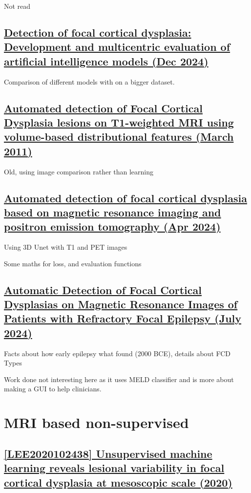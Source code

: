Not read

\newpage
\subsection{\href{https://pmc.ncbi.nlm.nih.gov/articles/PMC11997906/}{Detection of focal cortical dysplasia: Development and multicentric evaluation of artificial intelligence models (Dec 2024)}}

Comparison of different models with on a bigger dataset.

\newpage
\subsection{\href{https://ieeexplore.ieee.org/document/5872541}{Automated detection of Focal Cortical Dysplasia lesions on T1-weighted MRI using volume-based distributional features (March 2011)}}

Old, using image comparison rather than learning

\newpage
\subsection{\href{https://www.sciencedirect.com/science/article/pii/S1059131124000463}{Automated detection of focal cortical dysplasia based on magnetic resonance imaging and positron emission tomography (Apr 2024)}}

Using 3D Unet with T1 and PET images

Some maths for loss, and evaluation functions

\newpage
\subsection{\href{file://papers/Automatic_detection_joao.pdf}{Automatic Detection of Focal Cortical Dysplasias on Magnetic Resonance Images of Patients with Refractory Focal Epilepsy (July 2024)}}

Facts about how early epilepsy what found (2000 BCE), details about FCD Types

Work done not interesting here as it uses MELD classifier and is more about making a GUI to help clinicians.

\newpage
\section{MRI based non-supervised}
\label{ul}

\subsection{\href{https://www.sciencedirect.com/science/article/pii/S2213158220302758}{[LEE2020102438] Unsupervised machine learning reveals lesional variability in focal cortical dysplasia at mesoscopic scale (2020) }}
\label{ul1}

